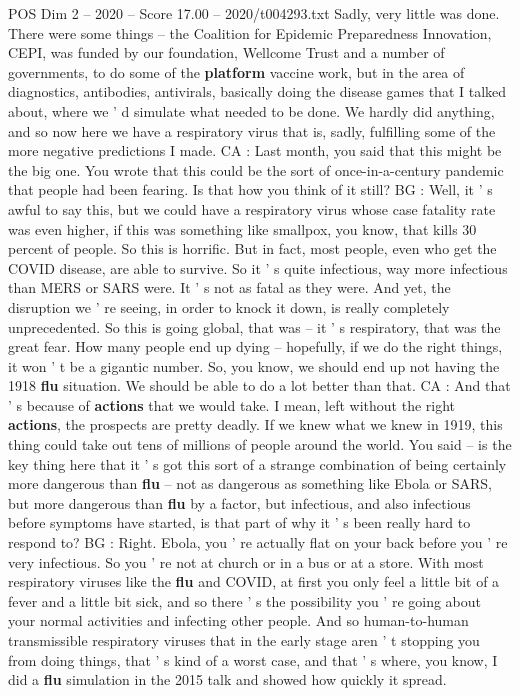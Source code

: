 \begin{textsample}{POS Dim 2 – 2020 – Score 17.00 – 2020/t004293.txt}
Sadly, very little was done.
There were some things -- the Coalition for Epidemic Preparedness Innovation, CEPI, was funded by our foundation, Wellcome Trust and a number of governments, to do some of the \textbf{platform} vaccine work, but in the area of diagnostics, antibodies, antivirals, basically doing the disease games that I talked about, where we ' d simulate what needed to be done.
We hardly did anything, and so now here we have a respiratory virus that is, sadly, fulfilling some of the more negative predictions I made.
CA : Last month, you said that this might be the big one.
You wrote that this could be the sort of once-in-a-century pandemic that people had been fearing.
Is that how you think of it still?
BG : Well, it ' s awful to say this, but we could have a respiratory virus whose case fatality rate was even higher, if this was something like smallpox, you know, that kills 30 percent of people.
So this is horrific.
But in fact, most people, even who get the COVID disease, are able to survive.
So it ' s quite infectious, way more infectious than MERS or SARS were.
It ' s not as fatal as they were.
And yet, the disruption we ' re seeing, in order to knock it down, is really completely unprecedented.
So this is going global, that was -- it ' s respiratory, that was the great fear.
How many people end up dying -- hopefully, if we do the right things, it won ' t be a gigantic number.
So, you know, we should end up not having the 1918 \textbf{flu} situation.
We should be able to do a lot better than that.
CA : And that ' s because of \textbf{actions} that we would take.
I mean, left without the right \textbf{actions}, the prospects are pretty deadly.
If we knew what we knew in 1919, this thing could take out tens of millions of people around the world.
You said -- is the key thing here that it ' s got this sort of a strange combination of being certainly more dangerous than \textbf{flu} -- not as dangerous as something like Ebola or SARS, but more dangerous than \textbf{flu} by a factor, but infectious, and also infectious before symptoms have started, is that part of why it ' s been really hard to respond to?
BG : Right.
Ebola, you ' re actually flat on your back before you ' re very infectious.
So you ' re not at church or in a bus or at a store.
With most respiratory viruses like the \textbf{flu} and COVID, at first you only feel a little bit of a fever and a little bit sick, and so there ' s the possibility you ' re going about your normal activities and infecting other people.
And so human-to-human transmissible respiratory viruses that in the early stage aren ' t stopping you from doing things, that ' s kind of a worst case, and that ' s where, you know, I did a \textbf{flu} simulation in the 2015 talk and showed how quickly it spread.

\end{textsample}
